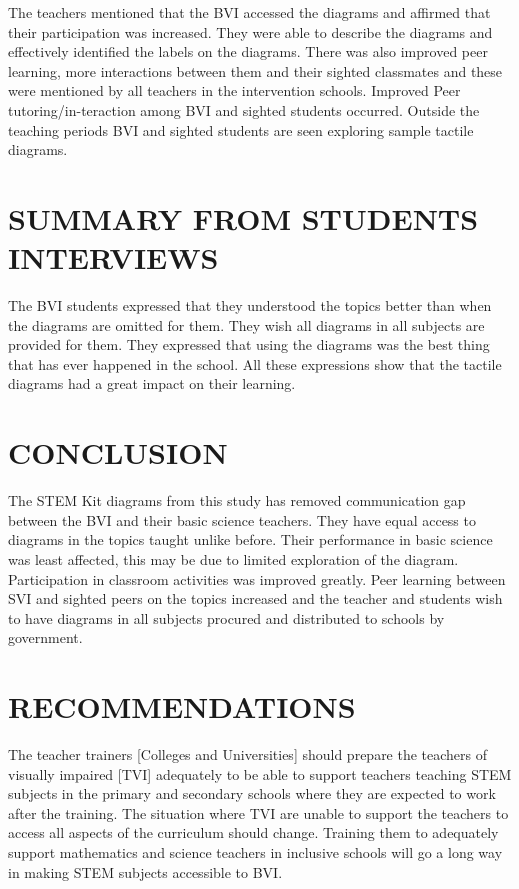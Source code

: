 \documentclass[11.5pt]{sig-alternate} %
\begin{document}
\begin{large}
The teachers mentioned that the BVI accessed the diagrams and affirmed that their participation was increased. They were able to describe the diagrams and effectively identified the labels on the diagrams.  There was also improved peer learning, more interactions between them and their sighted classmates and these were mentioned by all teachers in the intervention schools. Improved Peer tutoring/in-teraction among BVI and sighted students occurred. Outside the teaching periods BVI and sighted students are seen exploring sample tactile diagrams.

\section*{SUMMARY FROM STUDENTS INTERVIEWS}

The BVI students expressed that they understood the topics better than when the diagrams are omitted for them. They wish all diagrams in all subjects are provided for them. They expressed that using the diagrams was the best thing that has ever happened in the school. All these expressions show that the tactile diagrams had a great impact on their learning.
 

\section*{CONCLUSION}

The STEM Kit\textcopyright{} diagrams from this study has removed communication gap between the BVI and their basic science teachers. They have equal access to diagrams in the topics taught unlike before. Their performance in basic science was least affected, this may be due to limited exploration of the diagram. Participation in classroom activities was improved greatly. Peer learning between SVI and sighted peers on the topics increased and the teacher and students wish to have diagrams in all subjects procured and distributed to schools by government. 


\section*{RECOMMENDATIONS}

The teacher trainers [Colleges and Universities] should prepare the teachers of visually impaired [TVI] adequately to be able to support teachers teaching STEM subjects in the primary and secondary schools where they are expected to work after the training. The situation where TVI are unable to support the teachers to access all aspects of the curriculum should change. Training them to adequately support mathematics and science teachers in inclusive schools will go a long way in making STEM subjects accessible to BVI. 


\end{large}
\end{document}
